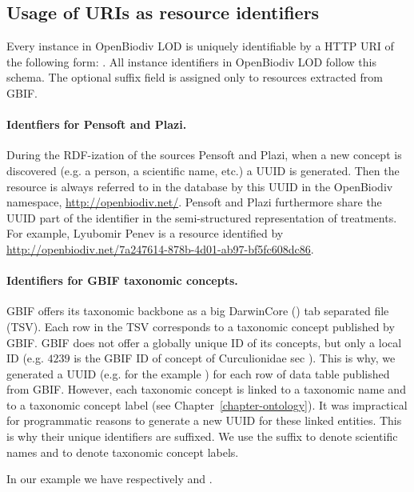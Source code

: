 \subsection{Usage of URIs as resource identifiers}

Every instance in OpenBiodiv LOD is uniquely identifiable by a HTTP URI of the following form: . All instance identifiers in OpenBiodiv LOD follow this schema. The optional suffix field is assigned only to resources extracted from GBIF.

\paragraph{Identfiers for Pensoft and Plazi.} During the RDF-ization of the sources Pensoft and Plazi, when a new concept is discovered (e.g. a person, a scientific name, etc.) a UUID is generated. Then the resource is always referred to in the database by this UUID in the OpenBiodiv namespace, \url{http://openbiodiv.net/}. Pensoft and Plazi furthermore share the UUID part of the identifier in the semi-structured representation of treatments. For example, Lyubomir Penev is a resource identified by \url{http://openbiodiv.net/7a247614-878b-4d01-ab97-bf5fc608dc86}.

\paragraph{Identifiers for GBIF taxonomic concepts.} GBIF offers its taxonomic backbone as a big DarwinCore (\cite{wieczorek_darwin_2012}) tab separated file (TSV). Each row in the TSV corresponds to a taxonomic concept published by GBIF. GBIF does not offer a globally unique ID of its concepts, but only a local ID (e.g. $4239$ is the GBIF ID of concept of Curculionidae sec \cite{gbif_secretariat_gbif_2017}). This is why, we generated a UUID (e.g. for the example ) for each row of data table published from GBIF. However, each taxonomic concept is linked to a taxonomic name and to a taxonomic concept label (see Chapter~\ref{chapter-ontology}). It was impractical for programmatic reasons to generate a new UUID for these linked entities. This is why their unique identifiers are suffixed. We use the suffix  to denote scientific names and  to denote taxonomic concept labels.

In our example we have respectively  and .

